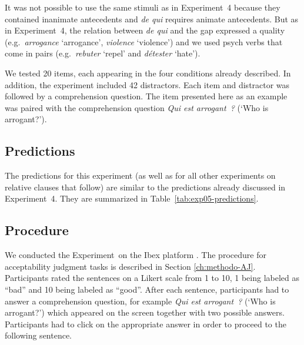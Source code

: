 \eal \label{ex:exp05-no}
\label{ex:exp05-subj-no}
\label{ex:exp05-obj-no}
\zl 

It was not possible to use the same stimuli as in Experiment~4 because they contained inanimate antecedents and \emph{de qui} requires animate antecedents. But as in Experiment~4, the relation between \emph{de qui} and the gap expressed a quality (e.g.\ \emph{arrogance} `arrogance', \emph{violence} `violence') and we used psych verbs that come in pairs (e.g.\ \emph{rebuter} `repel' and \emph{détester} `hate'). 

We tested 20 items, each appearing in the four conditions already described. In addition, the experiment included 42 distractors. Each item and distractor was followed by a comprehension question. The item presented here as an example was paired with the comprehension question \emph{Qui est arrogant~?} (`Who is arrogant?'). 

\subsection{Predictions} 

The predictions for this experiment (as well as for all other experiments on relative clauses that follow) are similar to the predictions already discussed in Experiment~4. They are summarized in Table~\ref{tab:exp05-predictions}. 



\subsection{Procedure} 

We conducted the Experiment~on the Ibex platform \citep{Ibex}. The procedure for acceptability judgment tasks is described in Section \ref{ch:methodo-AJ}. Participants rated the sentences on a Likert scale from 1 to 10, 1 being labeled as ``bad'' and 10 being labeled as ``good''. After each sentence, participants had to answer a comprehension question, for example \emph{Qui est arrogant~?} (`Who is arrogant?') which appeared on the screen together with two possible answers. Participants had to click on the appropriate answer in order to proceed to the following sentence.

